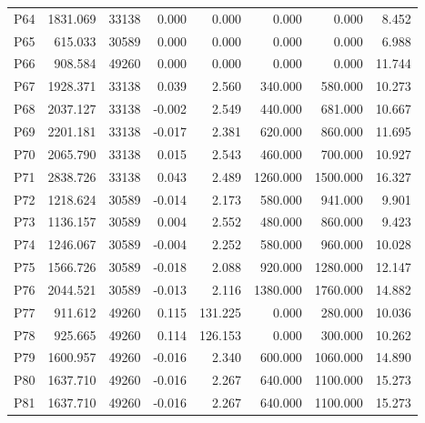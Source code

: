 \begin{longtable}{lrrrrrrr}
P64 & 1831.069 & 33138 & 0.000 & 0.000 & 0.000 & 0.000 & 8.452\\
P65 & 615.033 & 30589 & 0.000 & 0.000 & 0.000 & 0.000 & 6.988\\
P66 & 908.584 & 49260 & 0.000 & 0.000 & 0.000 & 0.000 & 11.744\\
P67 & 1928.371 & 33138 & 0.039 & 2.560 & 340.000 & 580.000 & 10.273\\
P68 & 2037.127 & 33138 & -0.002 & 2.549 & 440.000 & 681.000 & 10.667\\
P69 & 2201.181 & 33138 & -0.017 & 2.381 & 620.000 & 860.000 & 11.695\\
P70 & 2065.790 & 33138 & 0.015 & 2.543 & 460.000 & 700.000 & 10.927\\
P71 & 2838.726 & 33138 & 0.043 & 2.489 & 1260.000 & 1500.000 & 16.327\\
P72 & 1218.624 & 30589 & -0.014 & 2.173 & 580.000 & 941.000 & 9.901\\
P73 & 1136.157 & 30589 & 0.004 & 2.552 & 480.000 & 860.000 & 9.423\\
P74 & 1246.067 & 30589 & -0.004 & 2.252 & 580.000 & 960.000 & 10.028\\
P75 & 1566.726 & 30589 & -0.018 & 2.088 & 920.000 & 1280.000 & 12.147\\
P76 & 2044.521 & 30589 & -0.013 & 2.116 & 1380.000 & 1760.000 & 14.882\\
P77 & 911.612 & 49260 & 0.115 & 131.225 & 0.000 & 280.000 & 10.036\\
P78 & 925.665 & 49260 & 0.114 & 126.153 & 0.000 & 300.000 & 10.262\\
P79 & 1600.957 & 49260 & -0.016 & 2.340 & 600.000 & 1060.000 & 14.890\\
P80 & 1637.710 & 49260 & -0.016 & 2.267 & 640.000 & 1100.000 & 15.273\\
P81 & 1637.710 & 49260 & -0.016 & 2.267 & 640.000 & 1100.000 & 15.273\\
\end{longtable}\endgroup
